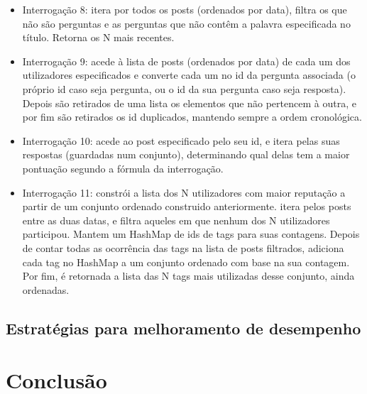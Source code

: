 \documentclass[10pt]{report}
\begin{document}
\begin{itemize}
\item Interrogação 8: itera por todos os posts (ordenados por data), filtra os que não são perguntas e as perguntas que não contêm a palavra especificada no título. Retorna os N mais recentes.

\item Interrogação 9: acede à lista de posts (ordenados por data) de cada um dos utilizadores especificados e converte cada um no id da pergunta associada (o próprio id caso seja pergunta, ou o id da sua pergunta caso seja resposta). Depois são retirados de uma lista os elementos que não pertencem à outra, e por fim são retirados os id duplicados, mantendo sempre a ordem cronológica.

\item Interrogação 10: acede ao post especificado pelo seu id, e itera pelas suas respostas (guardadas num conjunto), determinando qual delas tem a maior pontuação segundo a fórmula da interrogação.

\item Interrogação 11: constrói a lista dos N utilizadores com maior reputação a partir de um conjunto ordenado construido anteriormente. itera pelos posts entre as duas datas, e filtra aqueles em que nenhum dos N utilizadores participou. Mantem um HashMap de ids de tags para suas contagens. Depois de contar todas as ocorrência das tags na lista de posts filtrados, adiciona cada tag no HashMap a um conjunto ordenado com base na sua contagem. Por fim, é retornada a lista das N tags mais utilizadas desse conjunto, ainda ordenadas.

\end{itemize}

\section{Estratégias para melhoramento de desempenho}

\chapter{Conclusão}

\label{sec:conclusao}
\end{document}
